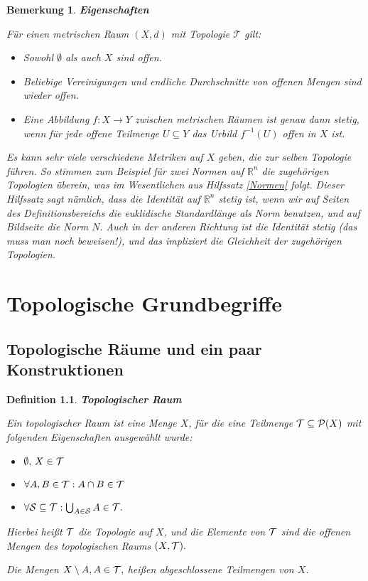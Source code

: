 \documentclass[12pt]{scrbook}   %
\newtheorem{bemX}[alles]{Bemerkung}
\newenvironment{bem}[1]{\begin{bemX}{\bf #1}\par\rm}{\end{bemX}}
\newtheorem{definiX}[alles]{Definition}
\newenvironment{defini}[1]{\begin{definiX}{\bf #1}\par\rm}{\end{definiX}}
\begin{document}
\begin{bem}{Eigenschaften}
Für einen metrischen Raum $(X,d)$ mit Topologie $\mathcal T$ gilt:
\begin{itemize}
\item Sowohl $\emptyset$ als auch $X$ sind offen.
\item Beliebige Vereinigungen und endliche Durchschnitte von offenen
Mengen sind wieder offen.

\item Eine Abbildung $f:X\longrightarrow Y$ zwischen metrischen Räumen ist genau 
dann stetig, wenn für jede offene Teilmenge $U\subseteq Y$ das Urbild
$f^{-1}(U)$ offen in $X$ ist.
\end{itemize}

Es kann sehr viele verschiedene Metriken auf $X$ geben, die zur selben 
Topologie führen. So stimmen zum Beispiel für zwei Normen auf $\mathbb R^n$
die zugehörigen Topologien überein, was im Wesentlichen aus Hilfssatz 
\ref{Normen} folgt. Dieser Hilfssatz sagt nämlich, dass die Identität auf
$\mathbb R^n$ stetig ist, wenn wir auf Seiten des Definitionsbereichs die
euklidische Standardlänge als Norm benutzen, und auf Bildseite die Norm $N.$
Auch in der anderen Richtung ist die Identität stetig (das muss man noch 
beweisen!), und das impliziert die Gleichheit der zugehörigen Topologien.   
\end{bem}




\chapter{Topologische Grundbegriffe}

\section{Topologische Räume und ein paar Konstruktionen}

\begin{defini}{Topologischer Raum}
Ein {\it topologischer Raum}  ist eine Menge 
$X$, für die eine Teilmenge 
${\cal T} \subseteq {\cal P} (X)$ mit folgenden Eigenschaften ausgewählt 
wurde:
\begin{itemize}
\item $\emptyset,\,X\in {\cal T}$
\item $\forall A,B\in {\cal T}: A\cap B\in {\cal T}$
\item $\forall {\cal S}\subseteq{\cal T}: \bigcup_{A\in {\cal S}}A \in {\cal T}.$
\end{itemize}
Hierbei heißt $\cal T$ die Topologie auf $X$, und die Elemente von 
$\cal T$ sind die  {\it offenen Mengen} des 
topologischen Raums $(X,{\cal T}).$ 

Die Mengen $X\setminus A, A\in {\cal T},$ heißen {\it abgeschlossene
Teilmengen} von $X$.
\end{defini}
\end{document}
